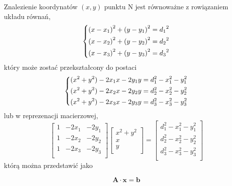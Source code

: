 Znalezienie koordynatów $(x,y)$ punktu N jest równoważne z rowiązaniem układu równań,
\begin{equation}
    \begin{dcases}
        {(x - x_1)}^2 + {(y - y_1)}^2 = {d_1}^2\\
        {(x - x_2)}^2 + {(y - y_2)}^2 = {d_2}^2\\
        {(x - x_3)}^2 + {(y - y_3)}^2 = {d_3}^2\\
    \end{dcases}
\end{equation}
który może zostać przekształcony do postaci
\begin{equation}
    \begin{dcases}
        (x^2 + y^2) - 2x_1x - 2y_1y = d_1^2 - x_1^2 - y_1^2\\
        (x^2 + y^2) - 2x_2x - 2y_2y = d_2^2 - x_2^2 - y_2^2\\
        (x^2 + y^2) - 2x_3x - 2y_3y = d_3^2 - x_3^2 - y_3^2\\
    \end{dcases}
\end{equation}
lub w reprezenacji macierzowej,
\begin{equation}
    \left[
        \begin{matrix}
            1 & -2x_1 & -2y_1\\
            1 & -2x_2 & -2y_2\\
            1 & -2x_3 & -2y_3\\
        \end{matrix}
    \right]
    \left[
        \begin{matrix}
            x^2 + y^2\\
            x\\
            y\\
        \end{matrix}
    \right]
    =
    \left[
        \begin{matrix}
            d_1^2 - x_1^2 - y_1^2\\
            d_2^2 - x_2^2 - y_2^2\\
            d_3^2 - x_3^2 - y_3^2\\
        \end{matrix}
    \right]
\end{equation}
którą można przedstawić jako

\begin{equation}
    \boldsymbol{A} \cdot \boldsymbol{x} = \boldsymbol{b}
\label{eq:matrix}
\end{equation}

